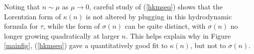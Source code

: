 \documentclass[10pt, oneside]{book}
\newcommand{\slantbox}[2][0]{\mbox{%
        \sbox{\foobox}{#2}%
        \hskip\wd\foobox
        \pdfsave
        \pdfsetmatrix{1 0 #1 1}%
        \llap{\usebox{\foobox}}%
        \pdfrestore
}}
\newcommand\unslant[2][-.25]{\slantbox[#1]{$#2$}}
\newcommand{\mdelta}{\text{\unslant[-.18]\delta}}
\newcommand{\mzeta}{\text{\unslant[-.15]\zeta}}
\begin{document}
\begin{doublespace}
Noting that $n\sim \mu$ as $\mu\rightarrow 0$,  careful study of (\ref{hkmseq}) shows that the Lorentzian form of $\kappa(n)$ is not altered by plugging in this hydrodynamic formula for $\tau$,   while the form of $\sigma(n)$ can be quite distinct,  with $\sigma(n)$ no longer growing quadratically at larger $n$.   This helps explain why in Figure \ref{mainfig}, (\ref{hkmseq}) gave a quantitatively good fit to $\kappa(n)$, but not to $\sigma(n)$.



\end{doublespace}
\end{document}

